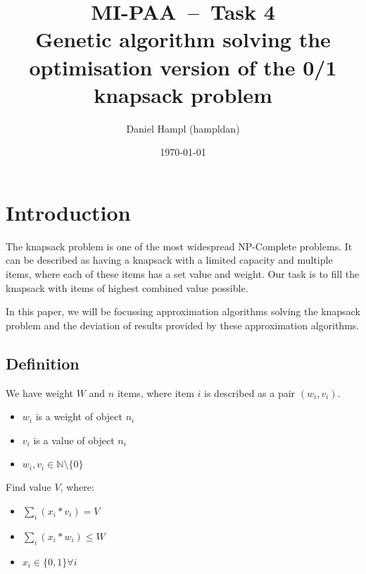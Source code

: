 
\RequirePackage{todonotes}
\RequirePackage[parfill]{parskip}
\RequirePackage[margin=2.8cm]{geometry}
\RequirePackage{hyperref}
\RequirePackage[english]{babel}
\RequirePackage{pgfplots}
\RequirePackage{listings}
\RequirePackage{amsfonts}
\RequirePackage{subfiles}
\RequirePackage{mathtools}

\providecommand{\tightlist}{%
  \setlength{\itemsep}{0pt}\setlength{\parskip}{0pt}}


\title{\textbf{MI-PAA~--~Task 4}\\
Genetic algorithm solving the optimisation version of the 0/1 knapsack problem}
\author{Daniel Hampl (hampldan)}
\date{\today}
\maketitle

\tableofcontents
\newpage

\section{Introduction}
The knapsack problem is one of the most widespread NP-Complete problems. It can be described as having a knapsack with a limited capacity and multiple items, where each of these items has a set value and weight. Our task is to fill the knapsack with items of highest combined value possible.

In this paper, we will be focussing approximation algorithms solving the knapsack problem and the deviation of results provided by these approximation algorithms.

\subsection{Definition\cite{WEBSITE:knapsackDef}}
We have weight $W$ and $n$ items, where item $i$ is described as a pair $(w_i, v_i)$.

\begin{itemize}
    \item $w_i$ is a weight of object $n_i$
    \item $v_i$ is a value of object $n_i$
    \item $w_i, v_i \in \mathbb{N}\setminus\{0\}$
\end{itemize}

Find value $V$, where:

\begin{itemize}
    \item $\sum_i(x_i*v_i) = V$
    \item $\sum_i(x_i*w_i) \leq W$
    \item $x_i \in \{0,1\} \forall i$
\end{itemize}


